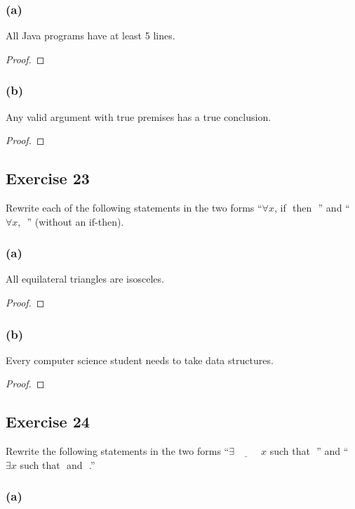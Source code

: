 \documentclass[14pt]{extarticle}
\newcommand{\fbl}{\underline{\hspace{1cm}}\,\,}
\newcommand{\fa}{\forall}
\newcommand{\te}{\exists}
\begin{document}
\subsubsection{(a)}
All Java programs have at least 5 lines.

\begin{proof}

\end{proof}

\subsubsection{(b)}
Any valid argument with true premises has a true conclusion.

\begin{proof}

\end{proof}

\subsection{Exercise 23}
Rewrite each of the following statements in the two forms “$\fa x$, if \fbl then \fbl” and “$\fa x$, \fbl” (without an if-then).

\subsubsection{(a)}
All equilateral triangles are isosceles.

\begin{proof}

\end{proof}

\subsubsection{(b)}
Every computer science student needs to take data structures.

\begin{proof}

\end{proof}

\subsection{Exercise 24}
Rewrite the following statements in the two forms “$\te \fbl x$ such that \fbl” and “$\te x$ such that \fbl and \fbl.”

\subsubsection{(a)}
\end{document}
